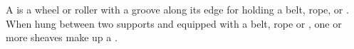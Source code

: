 \begin{module}[id=sheave]
\begin{definition}
  A  is a wheel or roller with a groove along its edge for holding a belt,
  rope, or . When hung between two supports and equipped with a belt,
  rope or , one or more sheaves make up a .
\end{definition}
\end{module}
